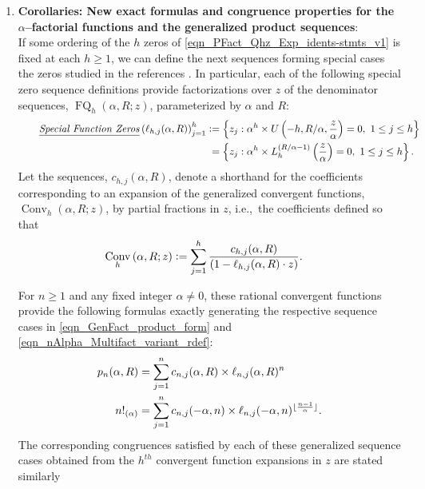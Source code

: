 \documentclass[12pt,reqno]{article}
\renewenvironment{subequations}{%
  \refstepcounter{equation}%
  \edef\theparentequation{\theequation}%
  \setcounter{parentequation}{\value{equation}}%
  \setcounter{equation}{0}%
  \def\theequation{\theparentequation.\alph{equation}}%
  \ignorespaces
}{%
  \setcounter{equation}{\value{parentequation}}%
  \ignorespacesafterend
}
\numberwithin{sfootnote}{section}
\numberwithin{equation}{section}
\newcommand{\tagtext}[1]{\tag*{\underline{\textit{#1}}}}
\newcommand{\itemlabel}[1]{\textbf{#1}: \\ }
\theoremstyle{DefaultTheoremStyle}
\theoremstyle{definition}
\newcommand{\ie}[0]{i.e.,\ }
\newcommand{\defequals}{\ensuremath{\vcentcolon=}}
\newcommand{\StartGroupingSubEquations}{\begin{subequations}}
\newcommand{\HypU}[3]{\ensuremath{U\left(#1, #2, #3\right)}}
\newcommand{\ConvGF}[4]{\ensuremath{\Conv_{#1}\left(#2, #3; #4\right)}}
\DeclareMathOperator{\FQ}{FQ}
\DeclareMathOperator{\Conv}{Conv}
\begin{document}
\begin{enumerate}
\item \itemlabel{Corollaries: 
       New exact formulas and congruence properties for the 
       $\alpha$--factorial functions and the generalized product sequences} 
If some ordering of the $h$ zeros of 
\eqref{eqn_PFact_Qhz_Exp_idents-stmts_v1} is fixed at each $h \geq 1$, 
we can define the next sequences 
forming special cases the zeros studied in the references 
\citep{LGWORKS-ASYMP-SPFNZEROS2008,PROPS-ZEROS-CHYPFNS80}. 
In particular, each of the following special zero sequence definitions 
provide factorizations over $z$ of the denominator sequences, 
$\FQ_h(\alpha, R; z)$, parameterized by $\alpha$ and $R$: 
\begin{align} 
\tagtext{Special Function Zeros} 
\left( \ell_{h,j}(\alpha, R) \right)_{j=1}^{h} & \defequals 
     \left\{ z_j : 
     \alpha^{h} \times \HypU{-h}{R / \alpha}{\frac{z}{\alpha}} = 0,\ 
     1 \leq j \leq h 
     \right\} \\ 
\notag 
     & \phantom{:} = 
     \left\{ z_j : 
     \alpha^{h} \times L_h^{(R / \alpha - 1)}\left(\frac{z}{\alpha}\right) = 0,\ 
     1 \leq j \leq h 
     \right\}. 
\end{align} 
Let the sequences, $c_{h,j}(\alpha, R)$, denote a shorthand 
for the coefficients corresponding to an 
expansion of the generalized convergent functions, 
$\ConvGF{h}{\alpha}{R}{z}$, by 
partial fractions in $z$, \ie the coefficients 
defined so that \citep[\S 1.2(iii)]{NISTHB} 
\begin{align*} 
\ConvGF{h}{\alpha}{R}{z} & \defequals 
     \sum_{j=1}^{h} \frac{c_{h,j}(\alpha, R)}{ 
     (1-\ell_{h,j}(\alpha, R) \cdot z)}. 
\end{align*} 
\StartGroupingSubEquations 
For $n \geq 1$ and any fixed integer $\alpha \neq 0$, these 
rational convergent functions 
provide the following formulas exactly generating the 
respective sequence cases in \eqref{eqn_GenFact_product_form} and 
\eqref{eqn_nAlpha_Multifact_variant_rdef}: 
\begin{align} 
\label{eqn_AlphaFactFn_Exact_PartialFracsRep_v1} 
p_n(\alpha, R) & = 
     \sum_{j=1}^{n} c_{n,j}(\alpha, R) \times 
     \ell_{n,j}(\alpha, R)^{n} \\ 
\notag 
n!_{(\alpha)} & = 
     \sum_{j=1}^{n} c_{n,j}(-\alpha, n) \times 
     \ell_{n,j}(-\alpha, n)^{\lfloor \frac{n-1}{\alpha} \rfloor}. 
\end{align} 
The corresponding congruences satisfied by each of these 
generalized sequence cases obtained from the $h^{th}$ 
convergent function expansions in $z$ are stated similarly 

\end{enumerate}
\end{document}
